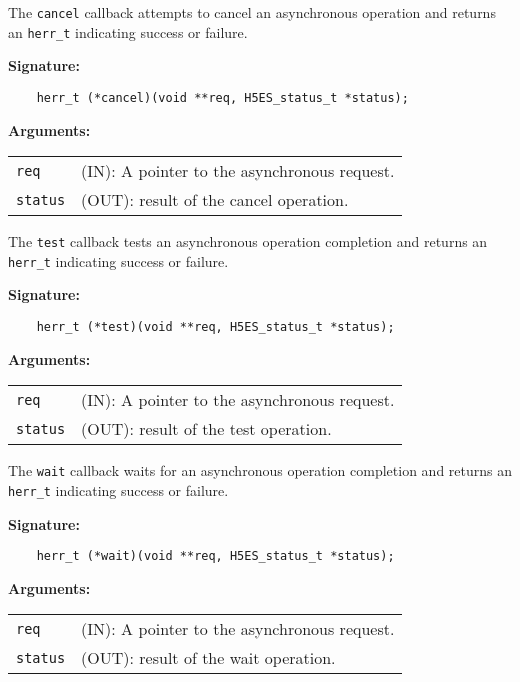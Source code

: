 The \texttt{cancel} callback attempts to cancel an asynchronous operation
and returns an \texttt{herr\_t} indicating success or failure.\bigskip

\begin{mdframed}[style=bgbox]
\textbf{Signature:}
\begin{lstlisting}
    herr_t (*cancel)(void **req, H5ES_status_t *status);
\end{lstlisting}

\textbf{Arguments:}\\
\begin{tabular}{l p{10cm}}
  \texttt{req} & (IN): A pointer to the asynchronous request.\\
  \texttt{status} & (OUT): result of the cancel operation.\\
\end{tabular}
\end{mdframed}

The \texttt{test} callback tests an asynchronous operation completion
and returns an \texttt{herr\_t} indicating success or failure.\bigskip

\begin{mdframed}[style=bgbox]
\textbf{Signature:}
\begin{lstlisting}
    herr_t (*test)(void **req, H5ES_status_t *status);
\end{lstlisting}

\textbf{Arguments:}\\
\begin{tabular}{l p{10cm}}
  \texttt{req} & (IN): A pointer to the asynchronous request.\\
  \texttt{status} & (OUT): result of the test operation.\\
\end{tabular}
\end{mdframed}

The \texttt{wait} callback waits for an asynchronous operation completion
and returns an \texttt{herr\_t} indicating success or failure.\bigskip

\begin{mdframed}[style=bgbox]
\textbf{Signature:}
\begin{lstlisting}
    herr_t (*wait)(void **req, H5ES_status_t *status);
\end{lstlisting}

\textbf{Arguments:}\\
\begin{tabular}{l p{10cm}}
  \texttt{req} & (IN): A pointer to the asynchronous request.\\
  \texttt{status} & (OUT): result of the wait operation.\\
\end{tabular}
\end{mdframed}

